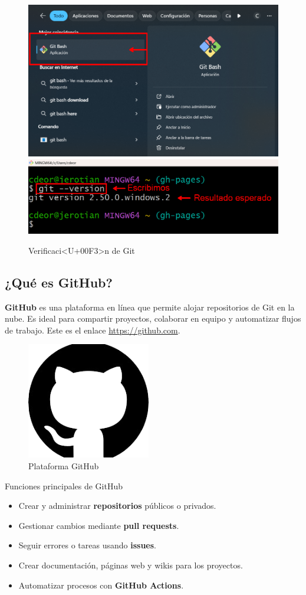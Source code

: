 \documentclass[
]{book}
\providecommand{\tightlist}{%
  \setlength{\itemsep}{0pt}\setlength{\parskip}{0pt}}
\begin{document}
\begin{figure}

{\centering \includegraphics[width=0.48\linewidth]{images/gb1} \includegraphics[width=0.48\linewidth]{images/gb2} 

}

\caption{Verificaci<U+00F3>n de Git}\label{fig:git-inst-b-fig}
\end{figure}

\subsection{¿Qué es GitHub?}\label{quuxe9-es-github}

\textbf{GitHub} es una plataforma en línea que permite alojar repositorios de Git en la nube. Es ideal para compartir proyectos, colaborar en equipo y automatizar flujos de trabajo. Este es el enlace \url{https://github.com}.

\begin{figure}

{\centering \includegraphics[width=0.3\linewidth]{images/github} 

}

\caption{Plataforma GitHub}\label{fig:github-fig}
\end{figure}

{} Funciones principales de GitHub

\begin{itemize}
\tightlist
\item
  Crear y administrar \textbf{repositorios} públicos o privados.
\item
  Gestionar cambios mediante \textbf{pull requests}.
\item
  Seguir errores o tareas usando \textbf{issues}.
\item
  Crear documentación, páginas web y wikis para los proyectos.
\item
  Automatizar procesos con \textbf{GitHub Actions}.
\end{itemize}
\end{document}
